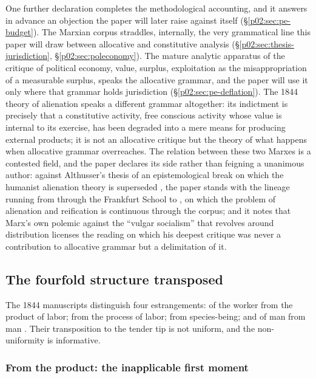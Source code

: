 One further declaration completes the methodological accounting, and it answers in advance an objection the paper will later raise against itself (\S\ref{p02:sec:pe-budget}). The Marxian corpus straddles, internally, the very grammatical line this paper will draw between allocative and constitutive analysis (\S\ref{p02:sec:thesis-jurisdiction}, \S\ref{p02:sec:poleconomy}). The mature analytic apparatus of the critique of political economy, value, surplus, exploitation as the misappropriation of a measurable surplus, speaks the allocative grammar, and the paper will use it only where that grammar holds jurisdiction (\S\ref{p02:sec:pe-deflation}). The 1844 theory of alienation speaks a different grammar altogether: its indictment is precisely that a constitutive activity, free conscious activity whose value is internal to its exercise, has been degraded into a mere means for producing external products; it is not an allocative critique but the theory of what happens when allocative grammar overreaches. The relation between these two Marxes is a contested field, and the paper declares its side rather than feigning a unanimous author: against Althusser's thesis of an epistemological break on which the humanist alienation theory is superseded \parencite{althusser1965for}, the paper stands with the lineage running from \textcite{lukacs1923history} through the Frankfurt School to \textcite{honneth2008reification}, on which the problem of alienation and reification is continuous through the corpus; and it notes that Marx's own polemic against the ``vulgar socialism'' that revolves around distribution \parencite{marx1875critique} licenses the reading on which his deepest critique was never a contribution to allocative grammar but a delimitation of it.

\subsection{The fourfold structure transposed}
\label{p02:sec:marx-fourfold}

The 1844 manuscripts distinguish four estrangements: of the worker from the product of labor; from the process of labor; from species-being; and of man from man \parencite{marx1844economic}. Their transposition to the tender tip is not uniform, and the non-uniformity is informative.

\subsubsection{From the product: the inapplicable first moment}
\label{p02:sec:marx-product}

